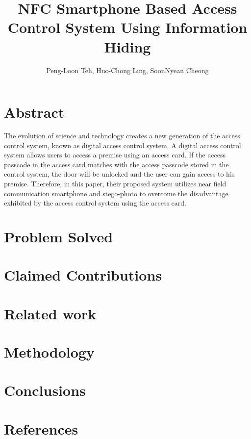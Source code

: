 \documentclass[•]{article}
\title{NFC Smartphone Based Access Control System Using Information Hiding}
\author{Peng-Loon Teh, Huo-Chong Ling, SoonNyean Cheong}
\date{}
\begin{document}
\tableofcontents
\maketitle

\section{Abstract}
The evolution of science and technology creates a new generation of the access control system, known as digital access control system. A digital access control system allows users to access a premise using an access card. If the access passcode in the access card matches with the access passcode stored in the control system, the door will be unlocked and the user can gain access to his premise. Therefore, in this paper, their proposed system utilizes near field communication smartphone and stego-photo to overcome the disadvantage exhibited by the access control system using the access card.
\section{Problem Solved}

\section{Claimed Contributions}

\section{Related work}

\section{Methodology}

\section{Conclusions}

\section{References}
\end{document}
